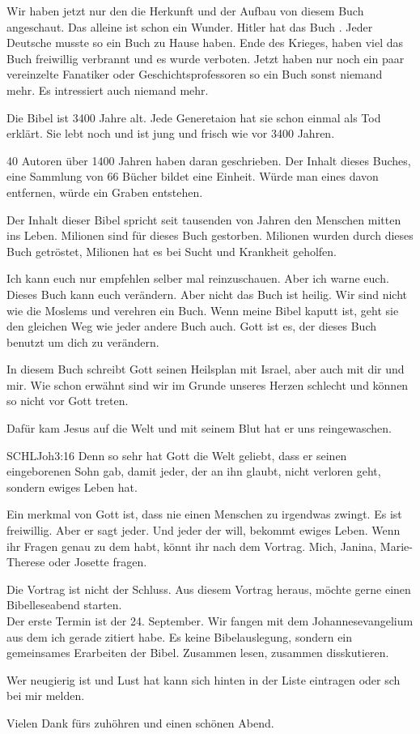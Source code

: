 \documentclass[fontsize=16pt]{mybib}
\begin{document}
\begin{otsblock}
    Wir haben jetzt nur den die Herkunft und der Aufbau von diesem Buch angeschaut. Das alleine ist schon ein Wunder. Hitler hat das Buch . Jeder Deutsche musste so ein Buch zu Hause haben. Ende des Krieges, haben viel das Buch freiwillig verbrannt und es wurde verboten. Jetzt haben nur noch ein paar vereinzelte Fanatiker oder Geschichtsprofessoren so ein Buch sonst niemand mehr. Es intressiert auch niemand mehr.

    Die Bibel ist 3400 Jahre alt. Jede Generetaion hat sie schon einmal als Tod erklärt. Sie lebt noch und ist jung und frisch wie vor 3400 Jahren.

    40 Autoren über 1400 Jahren haben daran geschrieben. Der Inhalt dieses Buches, eine Sammlung von 66 Bücher bildet eine Einheit. Würde man eines davon entfernen, würde ein Graben entstehen.

    Der Inhalt dieser Bibel spricht seit tausenden von Jahren den Menschen mitten ins Leben. Milionen sind für dieses Buch gestorben. Milionen wurden durch dieses Buch getröstet, Milionen hat es bei Sucht und Krankheit geholfen.

    Ich kann euch nur empfehlen selber mal reinzuschauen. Aber ich warne euch. Dieses Buch kann euch verändern. Aber nicht das Buch ist heilig. Wir sind nicht wie die Moslems und verehren ein Buch. Wenn meine Bibel kaputt ist, geht sie den gleichen Weg wie jeder andere Buch auch. Gott ist es, der dieses Buch benutzt um dich zu verändern.

    In diesem Buch schreibt Gott seinen Heilsplan mit Israel, aber auch mit dir und mir. Wie schon erwähnt sind wir im Grunde unseres Herzen schlecht und können so nicht vor Gott treten.

    Dafür kam Jesus auf die Welt und mit seinem Blut hat er uns reingewaschen.

    \begin{bibelbox}{SCHL}{Joh}{3:16}
        Denn so sehr hat Gott die Welt geliebt, dass er seinen eingeborenen Sohn gab, damit jeder, der an ihn glaubt, nicht verloren geht, sondern ewiges Leben hat.
    \end{bibelbox}
    Ein merkmal von Gott ist, dass nie einen Menschen zu irgendwas zwingt. Es ist freiwillig. Aber er sagt jeder. Und jeder der will, bekommt ewiges Leben. Wenn ihr Fragen genau zu dem habt, könnt ihr nach dem Vortrag. Mich, Janina, Marie-Therese oder Josette fragen.

    Die Vortrag ist nicht der Schluss. Aus diesem Vortrag heraus, möchte gerne einen Bibelleseabend starten.\\
    Der erste Termin ist der 24. September. Wir fangen mit dem Johannesevangelium aus dem ich gerade zitiert habe. Es keine Bibelauslegung, sondern ein gemeinsames Erarbeiten der Bibel. Zusammen lesen, zusammen disskutieren.

    Wer neugierig ist und Lust hat kann sich hinten in der Liste eintragen oder sch bei mir melden.

    Vielen Dank fürs zuhöhren und einen schönen Abend.
\end{otsblock}
\end{document}
